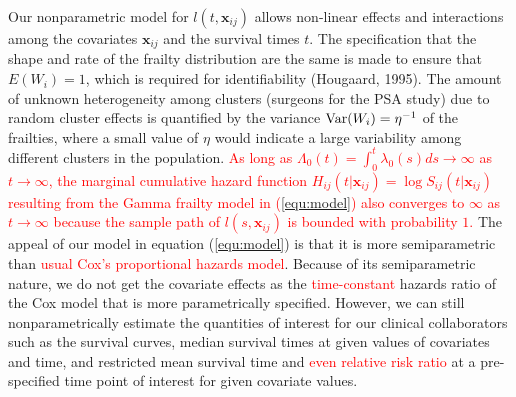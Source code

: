 \documentclass[11pt]{article}
\newcommand{\Var}{{\rm Var}}
\begin{document}
Our nonparametric model for $l(t,\mathbf x_{ij})$ allows non-linear effects and interactions among the covariates $\mathbf x_{ij}$ and the survival times $t$. The specification that the shape and rate of the frailty distribution are the same is made to ensure that $E(W_i) = 1$, which is required for identifiability (Hougaard, 1995). The amount of unknown heterogeneity among clusters (surgeons for the PSA study) due to random cluster effects is quantified by the variance $\Var(W_i) = \eta^{-1}$ of the frailties, where a small value of $\eta$ would indicate a large variability among different clusters in the population. \textcolor{red}{As long as $\Lambda_0(t)=\int_0^t\lambda_0(s)ds\to \infty$ as $t\to\infty$, the marginal cumulative hazard function $H_{ij}(t|\mathbf{x}_{ij})=\log S_{ij}(t|\mathbf{x}_{ij})$ resulting from the Gamma frailty model in (\ref{equ:model}) also converges to $\infty$ as $t\to \infty$ because the sample path of $l(s,\mathbf{x}_{ij})$ is bounded with probability $1$.} The appeal of our model in equation (\ref{equ:model}) is that it is more semiparametric than \textcolor{red}{usual Cox's proportional hazards model}. Because of its semiparametric nature, we do not get the covariate effects as the \textcolor{red}{time-constant} hazards ratio of the Cox model that is more parametrically specified. However, we can still nonparametrically estimate the quantities of interest for our clinical collaborators such as the survival curves, median survival times at given values of covariates and time, and restricted mean survival time and \textcolor{red}{even relative risk ratio} at a pre-specified time point of interest for given covariate values.
\end{document}
